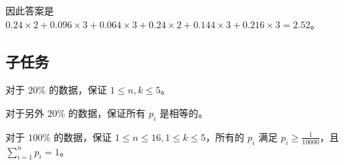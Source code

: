 因此答案是 $0.24 \times 2 + 0.096 \times 3 + 0.064 \times 3 + 0.24 \times 2 + 0.144 \times 3 + 0.216 \times 3 = 2.52$。

\examplebox{}{}

\subsection*{子任务}

对于 $20\%$ 的数据，保证 $1 \leq n, k \leq 5$。

对于另外 $20\%$ 的数据，保证所有 $p_i$ 是相等的。

对于 $100\%$ 的数据，保证 $1 \leq n \leq 16, 1 \leq k \leq 5$，所有的 $p_i$ 满足 $p_i \geq \frac{1}{10000}$，且 $\sum_{i=1}^{n} p_i=1$。

